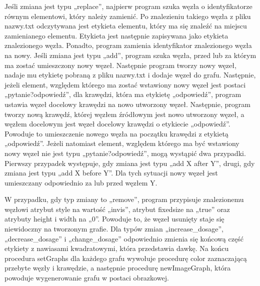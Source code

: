 Jeśli zmiana jest typu „replace”, najpierw program szuka węzła o identyfikatorze równym elementowi, który należy zamienić. Po znalezieniu takiego węzła z pliku nazwy.txt odczytywana jest etykieta elementu, który ma się znaleźć na miejscu zamienianego elementu. Etykieta jest następnie zapisywana jako etykieta znalezionego węzła. Ponadto, program zamienia identyfikator znalezionego węzła na nowy. Jeśli zmiana jest typu „add”, program szuka węzła, przed lub za którym ma zostać umieszczony nowy węzeł. Następnie program tworzy nowy węzeł, nadaje mu etykietę pobraną z pliku nazwy.txt i dodaje węzeł do grafu. Następnie, jeżeli element, względem którego ma zostać wstawiony nowy węzeł jest postaci „pytanie?odpowiedź”, dla krawędzi, która ma etykietę „odpowiedź”, program ustawia węzeł docelowy krawędzi na nowo utworzony węzeł. Następnie, program tworzy nową krawędź, której węzłem źródłowym jest nowo utworzony węzeł, a węzłem docelowym jest węzeł docelowy krawędzi o etykiecie „odpowiedź”. Powoduje to umieszczenie nowego węzła na początku krawędzi z etykietą „odpowiedź”. Jeżeli natomiast element, względem którego ma być wstawiony nowy węzeł nie jest typu „pytanie?odpowiedź”, mogą wystąpić dwa przypadki. Pierwszy przypadek występuje, gdy zmiana jest typu „add X after Y”, drugi, gdy zmiana jest typu „add X before Y”. Dla tych sytuacji nowy węzeł jest umieszczany odpowiednio za lub przed węzłem Y. 

W przypadku, gdy typ zmiany to „remove”, program przypisuje znalezionemu węzłowi atrybut style na wartość „invis”, atrybut fixedsize na „true” oraz atrybuty height i width na „0”. Powoduje to, że węzeł usunięty staje się niewidoczny na tworzonym grafie. Dla typów zmian „increase\_dosage”, „decrease\_dosage” i „change\_dosage” odpowiednio zmienia się końcową część etykiety z nawiasami kwadratowymi, która przedstawia dawkę. Na końcu procedura setGraphs dla każdego grafu wywołuje procedurę color zaznaczającą przebyte węzły i krawędzie, a następnie procedurę newImageGraph, która powoduje wygenerowanie grafu w postaci obrazkowej. 

